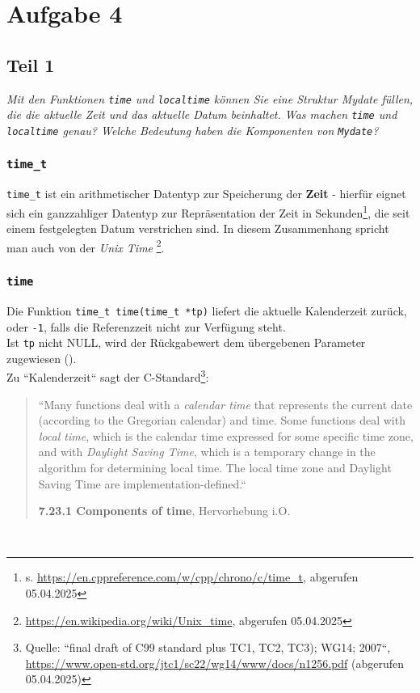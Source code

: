\chapter{Aufgabe 4}


\section{Teil 1}

\textit{Mit den Funktionen \texttt{time} und \texttt{localtime} können Sie eine Struktur
Mydate füllen, die die aktuelle Zeit und das aktuelle Datum beinhaltet.
Was machen \texttt{time} und \texttt{localtime} genau? Welche Bedeutung haben die
Komponenten von \texttt{Mydate}?}\\

\subsection*{\texttt{time\_t}}
\texttt{time\_t} ist ein arithmetischer Datentyp zur Speicherung der \textbf{Zeit} - hierfür eignet sich ein ganzzahliger Datentyp zur Repräsentation der Zeit in Sekunden\footnote{
s. \url{https://en.cppreference.com/w/cpp/chrono/c/time_t}, abgerufen 05.04.2025
}, die seit einem festgelegten Datum verstrichen sind.
In diesem Zusammenhang spricht man auch von der \textit{Unix Time} \footnote{
\url{https://en.wikipedia.org/wiki/Unix_time}, abgerufen 05.04.2025
}.

\subsection*{\texttt{time}}
Die Funktion \texttt{time\_t time(time\_t *tp)} liefert die aktuelle Kalenderzeit zurück, oder \texttt{-1}, falls die Referenzzeit nicht zur Verfügung steht.\\
Ist \texttt{tp} nicht NULL, wird der Rückgabewert dem übergebenen Parameter zugewiesen (\cite[256]{KR88}).\\

\noindent
Zu ``Kalenderzeit`` sagt der C-Standard\footnote{
    Quelle: ``final draft of C99 standard plus TC1, TC2, TC3); WG14; 2007``, \url{https://www.open-std.org/jtc1/sc22/wg14/www/docs/n1256.pdf} (abgerufen 05.04.2025)
}:

\blockquote[{\textbf{7.23.1 Components of time}, Hervorhebung i.O.}]{
``Many functions deal with a \textit{calendar time} that represents the current
date (according to the Gregorian calendar) and time. Some functions deal with \textit{local
    time}, which is the calendar time expressed for some specific time zone, and with \textit{Daylight
    Saving Time}, which is a temporary change in the algorithm for determining local time.
    The local time zone and Daylight Saving Time are implementation-defined.``
}\\


